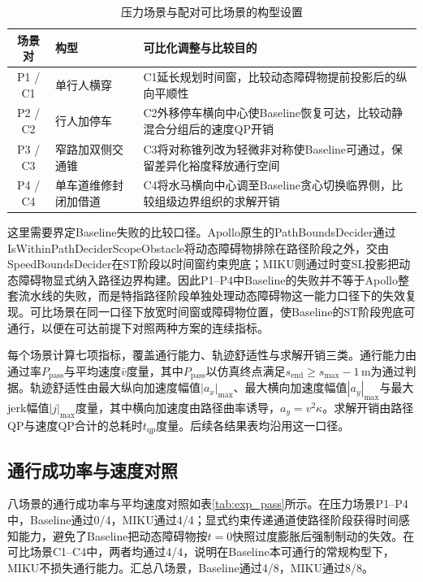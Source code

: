 \documentclass[a4paper,11pt]{ctexart}
\theoremstyle{definition}
\begin{document}
\begin{table}[htbp]
\centering
\caption{压力场景与配对可比场景的构型设置}
\label{tab:exp_scenarios}
\small
\begin{tabular}{c l p{7.4cm}}
\toprule
\textbf{场景对} & \textbf{构型} & \textbf{可比化调整与比较目的} \\
\midrule
P1 / C1 & 单行人横穿 & C1延长规划时间窗，比较动态障碍物提前投影后的纵向平顺性 \\
P2 / C2 & 行人加停车 & C2外移停车横向中心使Baseline恢复可达，比较动静混合分组后的速度QP开销 \\
P3 / C3 & 窄路加双侧交通锥 & C3将对称锥列改为轻微非对称使Baseline可通过，保留差异化裕度释放通行空间 \\
P4 / C4 & 单车道维修封闭加借道 & C4将水马横向中心调至Baseline贪心切换临界侧，比较组级边界组织的求解开销 \\
\bottomrule
\end{tabular}
\end{table}

这里需要界定Baseline失败的比较口径。Apollo原生的PathBoundsDecider通过IsWithinPathDeciderScopeObstacle将动态障碍物排除在路径阶段之外，交由SpeedBoundsDecider在ST阶段以时间窗约束兜底；MIKU则通过时变SL投影把动态障碍物显式纳入路径边界构建。因此P1--P4中Baseline的失败并不等于Apollo整套流水线的失败，而是特指路径阶段单独处理动态障碍物这一能力口径下的失效复现。可比场景在同一口径下放宽时间窗或障碍物位置，使Baseline的ST阶段兜底可通行，以便在可达前提下对照两种方案的连续指标。

每个场景计算七项指标，覆盖通行能力、轨迹舒适性与求解开销三类。通行能力由通过率$P_{\mathrm{pass}}$与平均速度$\bar v$度量，其中$P_{\mathrm{pass}}$以仿真终点满足$s_{\mathrm{end}} \geq s_{\max} - 1$\,m为通过判据。轨迹舒适性由最大纵向加速度幅值$|a_x|_{\max}$、最大横向加速度幅值$|a_y|_{\max}$与最大jerk幅值$|j|_{\max}$度量，其中横向加速度由路径曲率诱导，$a_y = v^2 \kappa$。求解开销由路径QP与速度QP合计的总耗时$t_{\mathrm{qp}}$度量。后续各结果表均沿用这一口径。

\subsection{通行成功率与速度对照}
\label{subsec:exp_passrate}

八场景的通行成功率与平均速度对照如表\ref{tab:exp_pass}所示。在压力场景P1--P4中，Baseline通过0/4，MIKU通过4/4；显式约束传递通道使路径阶段获得时间感知能力，避免了Baseline把动态障碍物按$t=0$快照过度膨胀后强制制动的失效。在可比场景C1--C4中，两者均通过4/4，说明在Baseline本可通行的常规构型下，MIKU不损失通行能力。汇总八场景，Baseline通过4/8，MIKU通过8/8。
\end{document}
